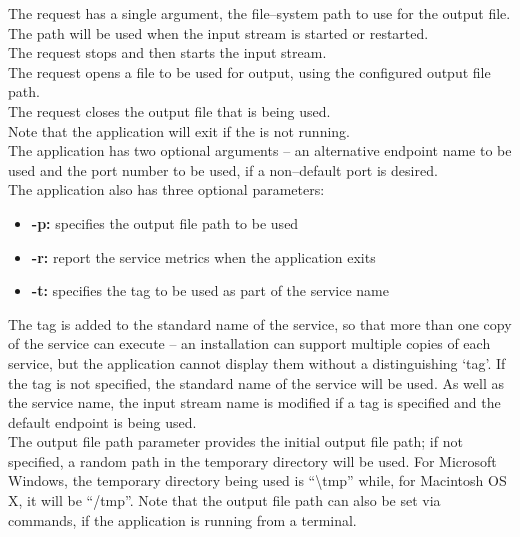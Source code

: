 The  request has a single argument,
the file--system path to use for the output file.
The path will be used when the input stream is started or restarted.\\

The  request stops and then
starts the input stream.\\

The  request opens a file to be
used for output, using the configured output file path.\\

The  request closes the output
file that is being used.\\

Note that the application will exit if the
 is not running.\\

The application has two optional arguments -- an alternative endpoint name to be used and
the port number to be used, if a non--default port is desired.\\

The application also has three optional parameters:
\begin{itemize}
\item \textbf{-p:} specifies the output file path to be used
\item \textbf{-r:} report the service metrics when the application exits
\item \textbf{-t:} specifies the tag to be used as part of the service name
\end{itemize}
The tag is added to the standard name of the service, so that more than one copy of the
service can execute -- an \mplusm{} installation can support multiple copies of each
 service, but the 
application cannot display them without a distinguishing `tag'.
If the tag is not specified, the standard name of the service will be used.
As well as the service name, the input stream name is modified if a tag is specified and
the default endpoint is being used.\\

The output file path parameter provides the initial output file path; if not specified, a
random path in the temporary directory will be used.
For Microsoft Windows, the temporary directory being used is ``\textbackslash{}tmp''
while, for Macintosh OS X, it will be ``/tmp''.
Note that the output file path can also be set via commands, if the application is
running from a terminal.\\

